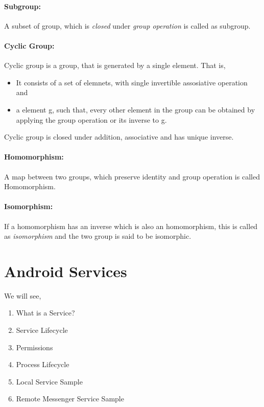 \documentclass[12pt]{article}
\begin{document}
\paragraph{Subgroup:} A subset of group, which is \textit{closed} under \textit{group operation} is called as subgroup.

\paragraph{Cyclic Group:} Cyclic group is a group, that is generated by a single element. That is,
\begin{itemize}
\item It consists of a set of elemnets, with single invertible assosiative operation and
\item a element g, such that, every other element in the group can be obtained by applying the group operation or its inverse to g.
\end{itemize}

Cyclic group is closed under addition, associative and has unique inverse.

\paragraph{Homomorphism:} A map between two groups, which preserve identity and group operation is called Homomorphism.

\paragraph{Isomorphism:} If a homomorphism has an inverse which is also an homomorphism, this is called as \textit{isomorphism} and the two group is said to be isomorphic.
\pagebreak
\section{Android Services}
\label{Android Services}

We will see, 
\begin{enumerate}
\item What is a Service?
\item Service Lifecycle
\item Permissions
\item Process Lifecycle
\item Local Service Sample
\item Remote Messenger Service Sample
\end{enumerate}
\end{document}

